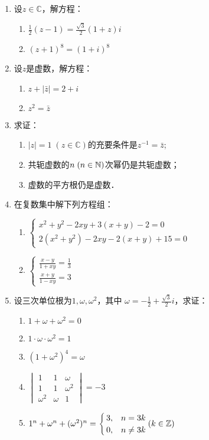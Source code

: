 \begin{enumerate}
\item 设$z\in\mathbb{C}$，解方程：
\begin{multicols}{2}
\begin{enumerate}[(1)]
    \item $\frac{1}{2}(z-1)=\frac{\sqrt{3}}{2}(1+z)i$
    \item $(z+1)^8=(1+i)^8$
\end{enumerate}
\end{multicols}

\item 设$z$是虚数，解方程：
\begin{multicols}{2}
\begin{enumerate}[(1)]
    \item $z+|\bar z|=2+i$
    \item $z^2=\bar z$
\end{enumerate}
\end{multicols}

\item 求证：
\begin{enumerate}[(1)]
    \item $|z|=1\; (z\in\mathbb{C})$的充要条件是$z^{-1}=\bar z$;
    \item 共轭虚数的$n\; (n\in\mathbb{N})$次幂仍是共轭虚数；
    \item 虚数的平方根仍是虚数．
\end{enumerate}

\item 在复数集中解下列方程组：
\begin{enumerate}[(1)]
    \item $\begin{cases}
        x^2+y^2-2xy+3(x+y)-2=0\\
        2(x^2+y^2)-2xy-2(x+y)+15=0
    \end{cases}$
    \item $\begin{cases}
        \frac{x-y}{1+xy}=\frac{1}{3}\\  \frac{x+y}{1-xy}=3
    \end{cases}$
\end{enumerate}    

\item 设三次单位根为$1,\omega,\omega^2$，其中
$\omega=-\frac{1}{2}+\frac{\sqrt{3}}{2}i$，求证：
\begin{enumerate}[(1)]
    \item $1+\omega+\omega^2=0$
    \item $1\cdot \omega\cdot \omega^2=1$
    \item $(1+\omega^2)^4=\omega$
    \item $\begin{vmatrix}
        1&1&\omega\\
        1&1&\omega^2\\
        \omega^2&\omega&1
    \end{vmatrix}=-3$
    \item $1^n+\omega^n+(\omega^2)^n=\begin{cases}
        3,& n=3k\\
        0,& n\ne 3k
    \end{cases}(k\in\mathbb{Z})$


\end{enumerate}
\end{enumerate}
